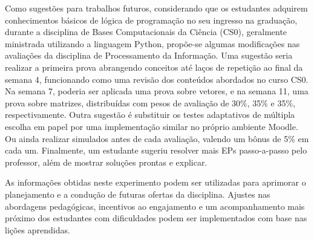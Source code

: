 Como sugestões para trabalhos futuros, considerando que os estudantes adquirem conhecimentos básicos de lógica de programação no seu ingresso na graduação, durante a disciplina de Bases Computacionais da Ciência (CS0), geralmente ministrada utilizando a linguagem Python, propõe-se algumas modificações nas avaliações da disciplina de Processamento da Informação. Uma sugestão seria realizar a primeira prova abrangendo conceitos até laços de repetição ao final da semana 4, funcionando como uma revisão dos conteúdos abordados no curso CS0. Na semana 7, poderia ser aplicada uma prova sobre vetores, e na semana 11, uma prova sobre matrizes, distribuídas com pesos de avaliação de 30\%, 35\% e 35\%, respectivamente. Outra sugestão é substituir os testes adaptativos de múltipla escolha em papel por uma implementação similar no próprio ambiente Moodle. Ou ainda realizar simulados antes de cada avaliação, valendo um bônus de 5\% em cada um. Finalmente, um estudante sugeriu resolver mais EPs passo-a-passo pelo professor, além de mostrar soluções prontas e explicar.

As informações obtidas neste experimento podem ser utilizadas para aprimorar o planejamento e a condução de futuras ofertas da disciplina. Ajustes nas abordagens pedagógicas, incentivos ao engajamento e um acompanhamento mais próximo dos estudantes com dificuldades podem ser implementados com base nas lições aprendidas.

